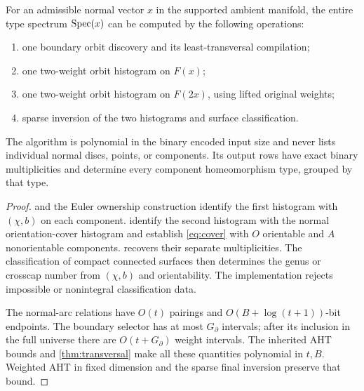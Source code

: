 \begin{theorem}
\label{thm:census}
For an admissible normal vector $x$ in the supported ambient manifold,
the entire type spectrum $\operatorname{Spec}(x)$ can be computed by the following
operations:
\begin{enumerate}
\item one boundary orbit discovery and its least-transversal compilation;
\item one two-weight orbit histogram on $F(x)$;
\item one two-weight orbit histogram on $F(2x)$, using lifted original weights;
\item sparse inversion of the two histograms and surface classification.
\end{enumerate}
The algorithm is polynomial in the binary encoded input size and never
lists individual normal discs, points, or components. Its output rows have
exact binary multiplicities and determine every component homeomorphism
type, grouped by that type.
\end{theorem}
\begin{proof}
 and the Euler ownership construction
identify the first histogram with $(\chi,b)$ on each component.
 identify the second histogram
with the normal orientation-cover histogram and establish
\eqref{eq:cover} with $O$ orientable and $A$ nonorientable components.
 recovers their separate multiplicities.
The classification of compact connected surfaces then determines the
genus or crosscap number from $(\chi,b)$ and orientability. The
implementation rejects impossible or nonintegral classification data.

The normal-arc relations have $O(t)$ pairings and
$O(B+\log(t+1))$-bit endpoints. The boundary selector has at most
$G_\partial$ intervals; after its inclusion in the full universe there
are $O(t+G_\partial)$ weight intervals. The inherited AHT bounds and
\cref{thm:transversal} make all these quantities polynomial in $t,B$.
Weighted AHT in fixed dimension and the sparse final inversion preserve
that bound.
\end{proof}

